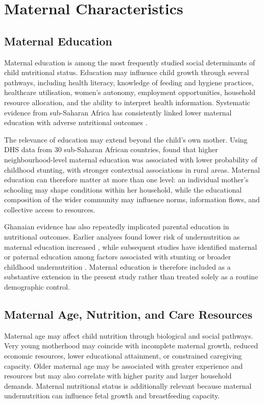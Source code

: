 \section{Maternal Characteristics}

\subsection{Maternal Education}

Maternal education is among the most frequently studied social determinants of child nutritional status. Education may influence child growth through several pathways, including health literacy, knowledge of feeding and hygiene practices, healthcare utilisation, women's autonomy, employment opportunities, household resource allocation, and the ability to interpret health information. Systematic evidence from sub-Saharan Africa has consistently linked lower maternal education with adverse nutritional outcomes \cite{AkombiEtAl2017}.

The relevance of education may extend beyond the child's own mother. Using DHS data from 30 sub-Saharan African countries, \citet{AgyenEtAl2024} found that higher neighbourhood-level maternal education was associated with lower probability of childhood stunting, with stronger contextual associations in rural areas. Maternal education can therefore matter at more than one level: an individual mother's schooling may shape conditions within her household, while the educational composition of the wider community may influence norms, information flows, and collective access to resources.

Ghanaian evidence has also repeatedly implicated parental education in nutritional outcomes. Earlier analyses found lower risk of undernutrition as maternal education increased \cite{AhetoEtAl2015}, while subsequent studies have identified maternal or paternal education among factors associated with stunting or broader childhood undernutrition \cite{BoahEtAl2019,SeworJayalakshmi2024}. Maternal education is therefore included as a substantive extension in the present study rather than treated solely as a routine demographic control.

\subsection{Maternal Age, Nutrition, and Care Resources}

Maternal age may affect child nutrition through biological and social pathways. Very young motherhood may coincide with incomplete maternal growth, reduced economic resources, lower educational attainment, or constrained caregiving capacity. Older maternal age may be associated with greater experience and resources but may also correlate with higher parity and larger household demands. Maternal nutritional status is additionally relevant because maternal undernutrition can influence fetal growth and breastfeeding capacity.

